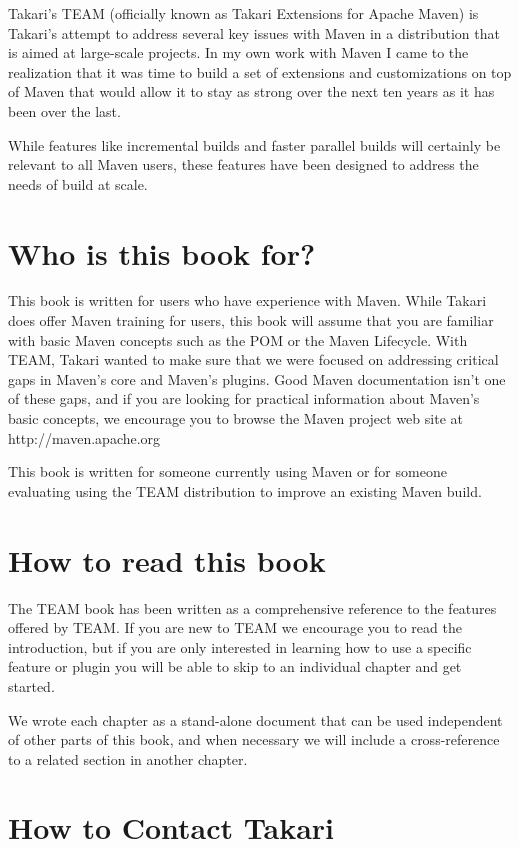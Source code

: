 \documentclass[a4paper]{book}
\begin{document}
Takari's TEAM (officially known as Takari Extensions for Apache Maven) is Takari's attempt to address several key issues with Maven in a distribution that is aimed at large-scale projects. In my own work with Maven I came to the realization that it was time to build a set of extensions and customizations on top of Maven that would allow it to stay as strong over the next ten years as it has been over the last.

While features like incremental builds and faster parallel builds will certainly be relevant to all Maven users, these features have been designed to address the needs of build at scale.

\section{Who is this book for?}\label{who-is-this-book-for}

This book is written for users who have experience with Maven. While Takari does offer Maven training for users, this book will assume that you are familiar with basic Maven concepts such as the POM or the Maven Lifecycle. With TEAM, Takari wanted to make sure that we were focused on addressing critical gaps in Maven's core and Maven's plugins. Good Maven documentation isn't one of these gaps, and if you are looking for practical information about Maven's basic concepts, we encourage you to browse the Maven project web site at http://maven.apache.org

This book is written for someone currently using Maven or for someone evaluating using the TEAM distribution to improve an existing Maven build.

\section{How to read this book}\label{how-to-read-this-book}

The TEAM book has been written as a comprehensive reference to the features offered by TEAM. If you are new to TEAM we encourage you to read the introduction, but if you are only interested in learning how to use a specific feature or plugin you will be able to skip to an individual chapter and get started.

We wrote each chapter as a stand-alone document that can be used independent of other parts of this book, and when necessary we will include a cross-reference to a related section in another chapter.

\section{How to Contact Takari}\label{how-to-contact-takari}
\end{document}
